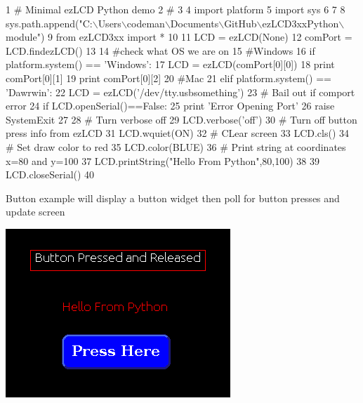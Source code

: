 \begin{DoxyCodeInclude}
1 \textcolor{comment}{# Minimal ezLCD Python demo}
2 \textcolor{comment}{#}
3 
4 \textcolor{keyword}{import} platform
5 \textcolor{keyword}{import} sys
6 
7 
8 sys.path.append(\textcolor{stringliteral}{"C:\(\backslash\)Users\(\backslash\)codeman\(\backslash\)Documents\(\backslash\)GitHub\(\backslash\)ezLCD3xxPython\(\backslash\)module"}) 
9 \textcolor{keyword}{from} ezLCD3xx \textcolor{keyword}{import} *
10 
11 LCD = ezLCD(\textcolor{keywordtype}{None}) 
12 comPort =  LCD.findezLCD()
13 
14 \textcolor{comment}{#check what OS we are on}
15 \textcolor{comment}{#Windows}
16 \textcolor{keywordflow}{if} platform.system() == \textcolor{stringliteral}{'Windows'}:
17     LCD = ezLCD(comPort[0][0])
18     \textcolor{keywordflow}{print} comPort[0][1]
19     \textcolor{keywordflow}{print} comPort[0][2] 
20 \textcolor{comment}{#Mac}
21 \textcolor{keywordflow}{elif} platform.system() == \textcolor{stringliteral}{'Dawrwin'}:
22     LCD = ezLCD(\textcolor{stringliteral}{'/dev/tty.usbsomething'})
23 \textcolor{comment}{# Bail out if comport error}
24 \textcolor{keywordflow}{if} LCD.openSerial()==\textcolor{keyword}{False}:
25     \textcolor{keywordflow}{print} \textcolor{stringliteral}{'Error Opening Port'}
26     \textcolor{keywordflow}{raise} SystemExit
27 
28 \textcolor{comment}{# Turn verbose off }
29 LCD.verbose(\textcolor{stringliteral}{'off'})
30 \textcolor{comment}{# Turn off button press info from ezLCD}
31 LCD.wquiet(ON)
32 \textcolor{comment}{# CLear screen}
33 LCD.cls()
34 \textcolor{comment}{# Set draw color to red}
35 LCD.color(BLUE)
36 \textcolor{comment}{# Print string at coordinates x=80 and y=100}
37 LCD.printString(\textcolor{stringliteral}{"Hello From Python"},80,100)
38 
39 LCD.closeSerial()
40 
\end{DoxyCodeInclude}
 Button example will display a button widget then poll for button presses and update screen \par
  
\begin{DoxyImageNoCaption}
  \mbox{\includegraphics{button.png}}
\end{DoxyImageNoCaption}
 
